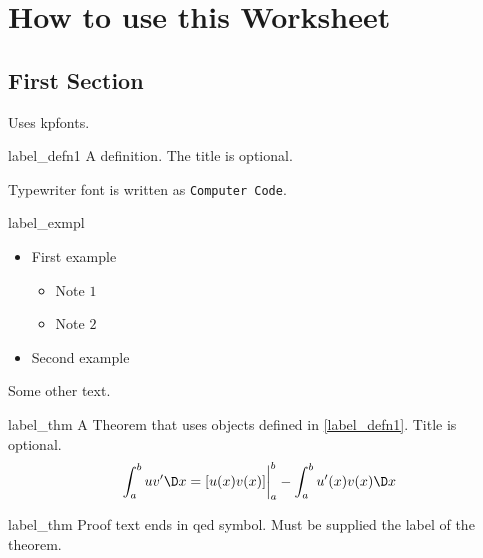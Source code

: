 \chapter{How to use this Worksheet}

\section{First Section}

Uses kpfonts.

\begin{defn}{label_defn1}
	A definition. The title is optional.
\end{defn}

Typewriter font is written as {\tt Computer Code}.

\begin{exmpl}[Title]{label_exmpl}
	\begin{itemize}
		\item First example 
		\begin{itemize}
			\item  Note $1$
			\item  Note $2$
		\end{itemize}
		\item Second example
	\end{itemize}
\end{exmpl}    



Some other text.

\begin{theo}{label_thm}
	A Theorem that uses objects defined in \cref{label_defn1}. Title is optional. 
	\[\dint_a^b u v' \dx = [u(x)v(x)] \eval_a^b - \dint_a^b u'(x) v(x) \dx\]
\end{theo}


\begin{prf}{label_thm}
	Proof text ends in qed symbol. Must be supplied the label of the theorem.
\end{prf}




